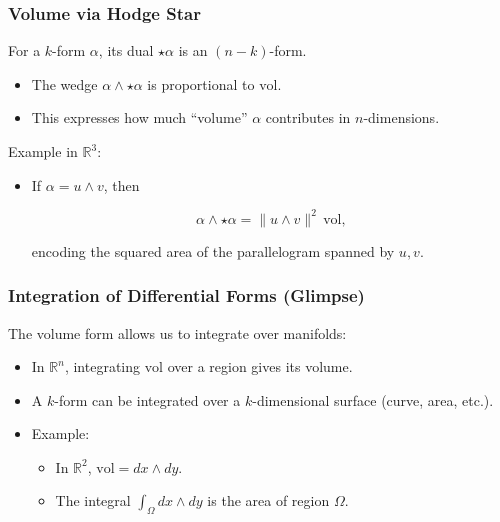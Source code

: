 \documentclass[
  letterpaper,
  DIV=11,
  numbers=noendperiod]{scrreprt}
\providecommand{\tightlist}{%
  \setlength{\itemsep}{0pt}\setlength{\parskip}{0pt}}
\begin{document}
\subsubsection{Volume via Hodge Star}\label{volume-via-hodge-star}

For a \(k\)-form \(\alpha\), its dual \(\star \alpha\) is an
\((n-k)\)-form.

\begin{itemize}
\tightlist
\item
  The wedge \(\alpha \wedge \star \alpha\) is proportional to
  \(\mathrm{vol}\).
\item
  This expresses how much ``volume'' \(\alpha\) contributes in
  \(n\)-dimensions.
\end{itemize}

Example in \(\mathbb{R}^3\):

\begin{itemize}
\item
  If \(\alpha = u \wedge v\), then

  \[
  \alpha \wedge \star \alpha = \|u \wedge v\|^2 \, \mathrm{vol},
  \]

  encoding the squared area of the parallelogram spanned by \(u,v\).
\end{itemize}

\subsubsection{Integration of Differential Forms
(Glimpse)}\label{integration-of-differential-forms-glimpse}

The volume form allows us to integrate over manifolds:

\begin{itemize}
\item
  In \(\mathbb{R}^n\), integrating \(\mathrm{vol}\) over a region gives
  its volume.
\item
  A \(k\)-form can be integrated over a \(k\)-dimensional surface
  (curve, area, etc.).
\item
  Example:

  \begin{itemize}
  \tightlist
  \item
    In \(\mathbb{R}^2\), \(\mathrm{vol} = dx \wedge dy\).
  \item
    The integral \(\int_\Omega dx \wedge dy\) is the area of region
    \(\Omega\).
  \end{itemize}
\end{itemize}
\end{document}
